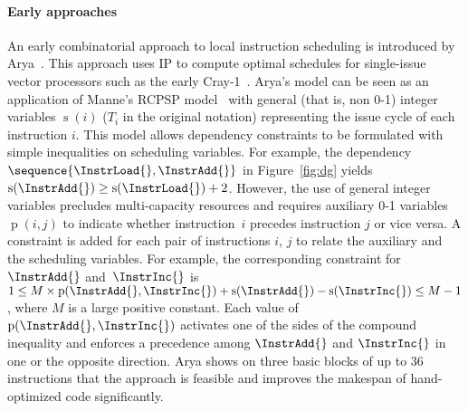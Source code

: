 \documentclass[acmsmall,authorversion,nonacm]{acmart}
\newcommand{\noMathVar}[2]{\operatorname{#1}(#2)}
\newcommand{\var}[2]{$\noMathVar{#1}{#2}$}
\begin{document}
\paragraph{Early approaches}

An early combinatorial approach to local instruction scheduling is
introduced by Arya~\cite{Arya1985}.
This approach uses IP to compute optimal schedules for single-issue
vector processors such as the early Cray-1~\cite{Russell1978}.
Arya's model can be seen as an application of Manne's RCPSP
model~\cite{Manne1960} with general (that is, non 0-1) integer
variables \var{s}{i} ($T_i$ in the original notation) representing the
issue cycle of each instruction $i$.
This model allows dependency constraints to be formulated with simple
inequalities on scheduling variables.
For example, the dependency $\sequence{\InstrLoad{}, \InstrAdd{}}$ in
Figure~\ref{fig:dg} yields $\noMathVar{s}{\InstrAdd{}} \ge
\noMathVar{s}{\InstrLoad{}} + 2$.
However, the use of general integer variables precludes multi-capacity
resources and requires auxiliary 0-1 variables \var{p}{i,j} to
indicate whether instruction~$i$ precedes instruction $j$ or vice
versa.
A constraint is added for each pair of instructions $i$, $j$ to relate
the auxiliary and the scheduling variables.
For example, the corresponding constraint for $\InstrAdd{}$
and~$\InstrInc{}$ is $1 \le M \times
\noMathVar{p}{\InstrAdd{},\InstrInc{}} + \noMathVar{s}{\InstrAdd{}} -
\noMathVar{s}{\InstrInc{}} \le M - 1$, where $M$ is a large positive
constant.
Each value of $\noMathVar{p}{\InstrAdd{},\InstrInc{}}$ activates one
of the sides of the compound inequality and enforces a precedence
among $\InstrAdd{}$ and $\InstrInc{}$ in one or the opposite
direction.
Arya shows on three basic blocks of up to 36 instructions that the
approach is feasible and improves the makespan of hand-optimized code
significantly.
\end{document}
